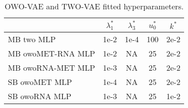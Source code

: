 \begin{table}[ht]
\centering
\caption{OWO-VAE and TWO-VAE fitted hyperparameters.}
\label{tab:vae_hp_fitted}
\begin{tabular}{l|c|c|c|c}
 & $\lambda_1^*$ & $\lambda_3^*$ & $u_0^*$ & $k^*$ \\ \hline
MB two MLP & 1e-2 & 1e-4 & 100 & 2e-2 \\ \hline
MB owoMET-RNA MLP & 1e-2 & NA & 25 & 2e-2 \\ \hline
MB owoRNA-MET MLP & 1e-3 & NA & 25 & 2e-2 \\ \hline
SB owoMET MLP & 1e-4 & NA & 25 & 2e-2 \\ \hline
SB owoRNA MLP & 1e-3 & NA & 25 & 1e-2
\end{tabular}
\end{table}